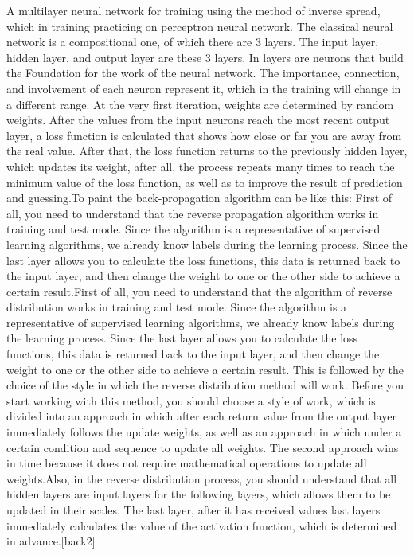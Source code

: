 \noindent A multilayer neural network for training using the method of inverse spread, which in training practicing on perceptron neural network. The classical neural network is a compositional one, of which there are 3 layers. The input layer, hidden layer, and output layer are these 3 layers. In layers are neurons that build the Foundation for the work of the neural network. The importance, connection, and involvement of each neuron represent it, which in the training will change in a different range. At the very first iteration, weights are determined by random weights. After the values from the input neurons reach the most recent output layer, a loss function is calculated that shows how close or far you are away from the real value. After that, the loss function returns to the previously hidden layer, which updates its weight, after all, the process repeats many times to reach the minimum value of the loss function, as well as to improve the result of prediction and guessing.To paint the back-propagation algorithm can be like this: First of all, you need to understand that the reverse propagation algorithm works in training and test mode. Since the algorithm is a representative of supervised learning algorithms, we already know labels during the learning process. Since the last layer allows you to calculate the loss functions, this data is returned back to the input layer, and then change the weight to one or the other side to achieve a certain result.First of all, you need to understand that the algorithm of reverse distribution works in training and test mode. Since the algorithm is a representative of supervised learning algorithms, we already know labels during the learning process. Since the last layer allows you to calculate the loss functions, this data is returned back to the input layer, and then change the weight to one or the other side to achieve a certain result. This is followed by the choice of the style in which the reverse distribution method will work. Before you start working with this method, you should choose a style of work, which is divided into an approach in which after each return value from the output layer immediately follows the update weights, as well as an approach in which under a certain condition and sequence to update all weights. The second approach wins in time because it does not require mathematical operations to update all weights.Also, in the reverse distribution process, you should understand that all hidden layers are input layers for the following layers, which allows them to be updated in their scales. The last layer, after it has received values last layers immediately calculates the value of the activation function, which is determined in advance.[back2]

